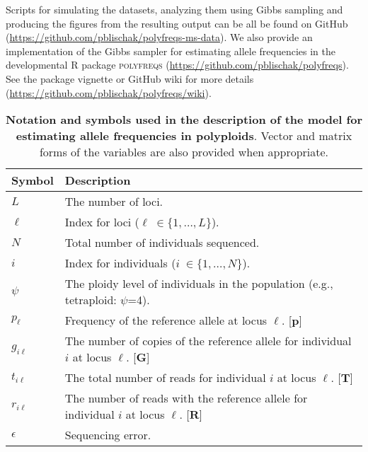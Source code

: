 \documentclass[11pt,english,letterpaper,oneside]{article}
\begin{document}
Scripts for simulating the datasets, analyzing them using Gibbs sampling and producing the figures from the resulting output can be all be found on GitHub (\url{https://github.com/pblischak/polyfreqs-ms-data}). We also provide an implementation of the Gibbs sampler for estimating allele frequencies in the developmental R package \textsc{polyfreqs} (\url{https://github.com/pblischak/polyfreqs}). See the package vignette or GitHub wiki for more details (\url{https://github.com/pblischak/polyfreqs/wiki}).
\vfill


\begin{table}[b]
\centering
{}
\caption{\textbf{Notation and symbols used in the description of the model for estimating allele frequencies in polyploids}. Vector and matrix forms of the variables are also provided when appropriate. }
\vspace{0.2in}
\bgroup
\def\arraystretch{1.45}
\begin{tabular}[l]{l | l}
\hline
\textbf{Symbol} & \textbf{Description}\\ \hline
$L$ & The number of loci. \\
$\ell$ & Index for loci ($\ell\; \in \{1,\ldots,L\}$). \\
$N$ & Total number of individuals sequenced. \\
$i$ & Index for individuals ($i\; \in \{1,\ldots,N\}$). \\
$\psi$ & The ploidy level of individuals in the population (e.g., tetraploid: $\psi$=4). \\
$p_{\ell}$ & Frequency of the reference allele at locus $\ell$. [$\bm{p}$] \\
$g_{i \ell}$ & The number of copies of the reference allele for individual $i$ at locus $\ell$. [$\bm{G}$] \\
$t_{i \ell}$ & The total number of reads for individual $i$ at locus $\ell$. [$\bm{T}$] \\
$r_{i \ell}$ & The number of reads with the reference allele for individual $i$ at locus $\ell$. [$\bm{R}$] \\
$\epsilon$ & Sequencing error. \\
\hline
\end{tabular}
\egroup
\label{table1}
\end{table}


\end{document}
